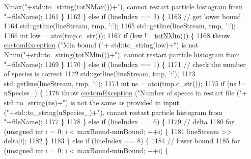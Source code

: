 \begin{DoxyCode}
{       Nmax("}+std::to\_string(\hyperlink{classsim_system_aee2c65ecb43a35c0c4d070cdb45f7dc0}{totNMax}())+\textcolor{stringliteral}{"), cannot restart particle histogram from "}+fileName);
1161                 \}
1162             \} \textcolor{keywordflow}{else} \textcolor{keywordflow}{if} (lineIndex == 3) \{
1163                 \textcolor{comment}{// get lower bound}
1164                 std::getline(lineStream, tmp, \textcolor{charliteral}{':'});
1165                 std::getline(lineStream, tmp, \textcolor{charliteral}{':'});
1166                 \textcolor{keywordtype}{int} low = atoi(tmp.c\_str());
1167                 \textcolor{keywordflow}{if} (low != \hyperlink{classsim_system_af10842e0eaa638373b8717c87b47e6bc}{totNMin}()) \{
1168                     \textcolor{keywordflow}{throw} \hyperlink{classcustom_exception}{customException} (\textcolor{stringliteral}{"Min bound ("}+ std::to\_string(low)+\textcolor{stringliteral}{") is not
       Nmin("}+std::to\_string(\hyperlink{classsim_system_af10842e0eaa638373b8717c87b47e6bc}{totNMin}())+\textcolor{stringliteral}{"), cannot restart particle histogram from "}+fileName);
1169                 \}
1170             \} \textcolor{keywordflow}{else} \textcolor{keywordflow}{if} (lineIndex == 1) \{
1171                 \textcolor{comment}{// check the number of species is correct}
1172                 std::getline(lineStream, tmp, \textcolor{charliteral}{':'});
1173                 std::getline(lineStream, tmp, \textcolor{charliteral}{':'});
1174                 \textcolor{keywordtype}{int} ns = atoi(tmp.c\_str());
1175                 \textcolor{keywordflow}{if} (ns != nSpecies\_) \{
1176                     \textcolor{keywordflow}{throw} \hyperlink{classcustom_exception}{customException} (\textcolor{stringliteral}{"Number of speces in restart file ("}+ 
      std::to\_string(ns)+\textcolor{stringliteral}{") is not the same as provided in input ("}+std::to\_string(nSpecies\_)+\textcolor{stringliteral}{"), cannot restart particle
       histogram from "}+fileName);
1177                 \}
1178             \} \textcolor{keywordflow}{else} \textcolor{keywordflow}{if} (lineIndex == 6) \{
1179                 \textcolor{comment}{// delta}
1180                 \textcolor{keywordflow}{for} (\textcolor{keywordtype}{unsigned} \textcolor{keywordtype}{int} i = 0; i < maxBound-minBound; ++i) \{
1181                     lineStream >> delta[i];
1182                 \}
1183             \} \textcolor{keywordflow}{else} \textcolor{keywordflow}{if} (lineIndex == 8) \{
1184                 \textcolor{comment}{// lower bound}
1185                 \textcolor{keywordflow}{for} (\textcolor{keywordtype}{unsigned} \textcolor{keywordtype}{int} i = 0; i < maxBound-minBound; ++i) \{

\end{DoxyCode}
